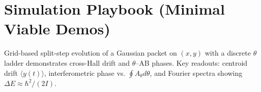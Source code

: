 \section{Simulation Playbook (Minimal Viable Demos)}\label{sec:simulation-playbook}
Grid-based split-step evolution of a Gaussian packet on $(x,y)$ with a discrete $\theta$ ladder demonstrates cross-Hall drift and $\theta$--AB phases. Key readouts: centroid drift $\langle y(t)\rangle$, interferometric phase vs. $\oint A_\theta d\theta$, and Fourier spectra showing $\Delta E\approx \hbar^2/(2I)$.
